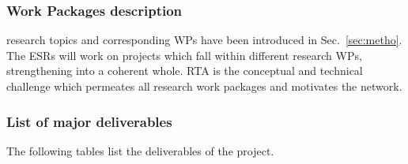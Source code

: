 %

\subsubsection{Work Packages description}\label{sec:WPdescription}
\label{sub:WPsDescription}

\acronym research topics and corresponding WPs have been introduced in Sec.~\ref{sec:metho}. 
The ESRs will work on projects which fall within different research WPs, strengthening \acronym into a coherent whole.
RTA is the conceptual and technical challenge which permeates all research work packages and motivates the network.
\vspace{-5mm}

\FloatBarrier

\subsubsection{List of major deliverables}
\label{sub:deliverables}

The following tables list the deliverables of the project. 

